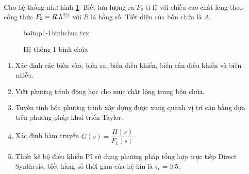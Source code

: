 \begin{exercise}
    Cho hệ thống như hình \ref{baitap1-1binhchua}: Biết lưu lượng ra $F_2$ tỉ lệ với chiều cao chất lỏng theo công thức $F_2 = R.h^{\sfrac{4}{3}}$ với $R$ là hằng số. Tiết diện của bồn chứa là $A$.
    \begin{figure}[htp]
        \begin{center}
            {baitap1-1binhchua.tex}
        \end{center}
        \caption{Hệ thống 1 bình chứa} \label{baitap1-1binhchua}
    \end{figure}

    \begin{enumerate}
        \item Xác định các biến vào, biến ra, biến điều khiển, biến cần điều khiển và biến nhiễu.
        \item Viết phương trình động học cho mức chất lỏng trong bồn chứa.
        \item Tuyến tính hóa phương trình xây dựng được xung quanh vị trí cân bằng dựa trên phương pháp khai triển Taylor.
        \item Xác định hàm truyền $G(s) = \dfrac{H(s)}{F_1(s)}$
        \item Thiết kế bộ điều khiển PI sử dụng phương pháp tổng hợp trực tiếp Direct Synthesis, biết hằng số thời gian của hệ kín là $\tau_c = 0.5$.
    \end{enumerate}
\end{exercise}
